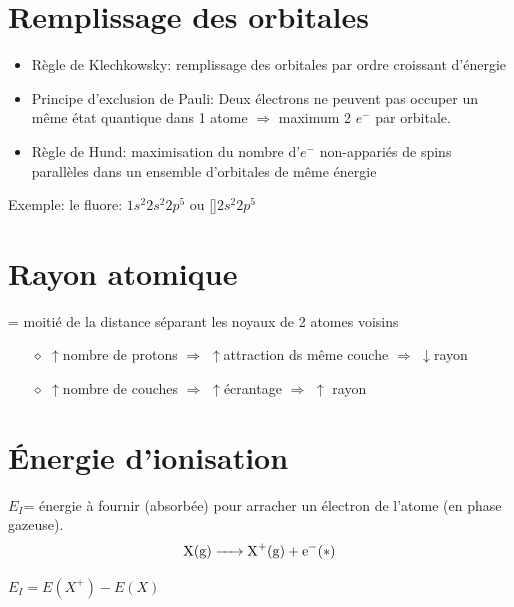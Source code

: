 \documentclass[11pt,a4paper,french]{article}
\begin{document}
\section{Remplissage des orbitales}
\begin{itemize}
	\item Règle de Klechkowsky: remplissage des orbitales par ordre croissant d'énergie
	\item Principe d'exclusion de Pauli: Deux électrons ne peuvent pas occuper un même état quantique dans 1 atome $\Rightarrow$ maximum 2 $e^-$ par orbitale.
	\item Règle de Hund: maximisation du nombre d'$e^-$ non-appariés de spins parallèles dans un ensemble d'orbitales de même énergie\\
\end{itemize}

Exemple: le fluore:  $1s^2 2s^2 2p^5$ ou []$2s^2 2p^5$


\section{Rayon atomique} = moitié de la distance séparant les noyaux de 2 atomes voisins
\begin{itemize}
	\item[$\diamond$]$\uparrow$nombre de protons $\Rightarrow$ $\uparrow$attraction ds même couche $\Rightarrow$  $\downarrow$rayon
	\item[$\diamond$]$\uparrow$nombre de couches $\Rightarrow$ $\uparrow$écrantage $\Rightarrow$ $\uparrow$ rayon
\end{itemize}

\section{\'Energie d'ionisation}
\label{sec:ioni}

$E_I$= énergie à fournir (absorbée) pour arracher un électron de l'atome (en phase gazeuse).
$$\ce{X(g) -> X+(g) + e-}(*)$$

$E_I = E(X^+)-E(X)$
\end{document}
